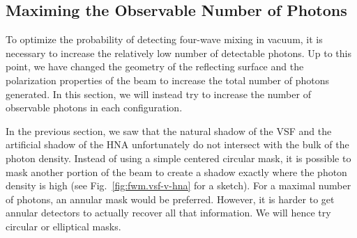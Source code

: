 \documentclass[11pt,SymmetricalJury]{inrsthesis/inrsthesis}
\begin{document}
\subsection{Maximing the Observable Number of Photons}

To optimize the probability of detecting four-wave mixing in vacuum, it is
necessary to increase the relatively low number of detectable photons. Up to
this point, we have changed the geometry of the reflecting surface and the polarization
properties of the beam to increase the total number of photons generated.
In this section, we will instead try to increase the number of observable photons
in each configuration.

In the previous section, we saw that the natural shadow of the VSF and the
artificial shadow of the HNA unfortunately do not intersect with the bulk
of the photon density. Instead of using a simple centered circular mask,
it is possible to mask another portion of the beam to create a shadow exactly
where the photon density is high (see Fig.~\ref{fig:fwm.vsf-v-hna} for a sketch).
For a maximal number of photons, an annular mask would be preferred. However,
it is harder to get annular detectors to actually recover all that information.
We will hence try circular or elliptical masks.
\end{document}
